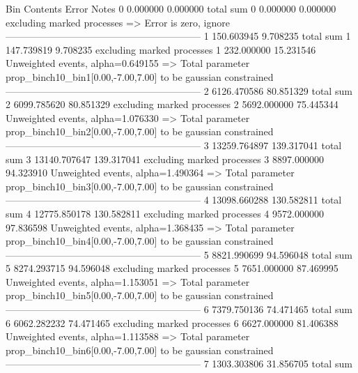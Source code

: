 Bin        Contents        Error           Notes                         
0          0.000000        0.000000        total sum                     
0          0.000000        0.000000        excluding marked processes    
  => Error is zero, ignore      
------------------------------------------------------------
1          150.603945      9.708235        total sum                     
1          147.739819      9.708235        excluding marked processes    
1          232.000000      15.231546       Unweighted events, alpha=0.649155
  => Total parameter prop_binch10_bin1[0.00,-7.00,7.00] to be gaussian constrained
------------------------------------------------------------
2          6126.470586     80.851329       total sum                     
2          6099.785620     80.851329       excluding marked processes    
2          5692.000000     75.445344       Unweighted events, alpha=1.076330
  => Total parameter prop_binch10_bin2[0.00,-7.00,7.00] to be gaussian constrained
------------------------------------------------------------
3          13259.764897    139.317041      total sum                     
3          13140.707647    139.317041      excluding marked processes    
3          8897.000000     94.323910       Unweighted events, alpha=1.490364
  => Total parameter prop_binch10_bin3[0.00,-7.00,7.00] to be gaussian constrained
------------------------------------------------------------
4          13098.660288    130.582811      total sum                     
4          12775.850178    130.582811      excluding marked processes    
4          9572.000000     97.836598       Unweighted events, alpha=1.368435
  => Total parameter prop_binch10_bin4[0.00,-7.00,7.00] to be gaussian constrained
------------------------------------------------------------
5          8821.990699     94.596048       total sum                     
5          8274.293715     94.596048       excluding marked processes    
5          7651.000000     87.469995       Unweighted events, alpha=1.153051
  => Total parameter prop_binch10_bin5[0.00,-7.00,7.00] to be gaussian constrained
------------------------------------------------------------
6          7379.750136     74.471465       total sum                     
6          6062.282232     74.471465       excluding marked processes    
6          6627.000000     81.406388       Unweighted events, alpha=1.113588
  => Total parameter prop_binch10_bin6[0.00,-7.00,7.00] to be gaussian constrained
------------------------------------------------------------
7          1303.303806     31.856705       total sum                     
